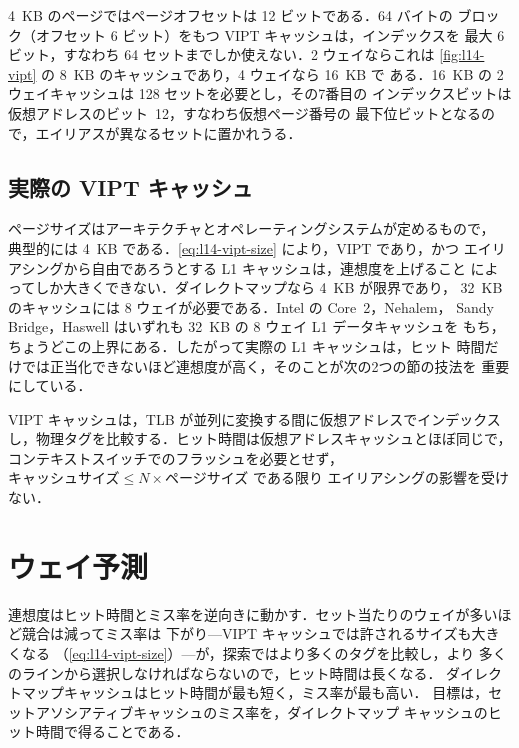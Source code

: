 \documentclass[../main.tex]{subfiles}
\begin{document}
\begin{example}
  \label{ex:l14-vipt-size}
  4~KB のページではページオフセットは 12 ビットである．64 バイトの
  ブロック（オフセット 6 ビット）をもつ VIPT キャッシュは，インデックスを
  最大 6 ビット，すなわち 64 セットまでしか使えない．2 ウェイならこれは
  \cref{fig:l14-vipt} の 8~KB のキャッシュであり，4 ウェイなら 16~KB で
  ある．16~KB の 2 ウェイキャッシュは 128 セットを必要とし，その7番目の
  インデックスビットは仮想アドレスのビット~12，すなわち仮想ページ番号の
  最下位ビットとなるので，エイリアスが異なるセットに置かれうる．
\end{example}

\subsection{実際の VIPT キャッシュ}

ページサイズはアーキテクチャとオペレーティングシステムが定めるもので，
典型的には 4~KB である．\cref{eq:l14-vipt-size} により，VIPT であり，かつ
エイリアシングから自由であろうとする L1 キャッシュは，連想度を上げること
によってしか大きくできない．ダイレクトマップなら 4~KB が限界であり，
32~KB のキャッシュには 8 ウェイが必要である．Intel の Core~2，Nehalem，
Sandy Bridge，Haswell はいずれも 32~KB の 8 ウェイ L1 データキャッシュを
もち，ちょうどこの上界にある．したがって実際の L1 キャッシュは，ヒット
時間だけでは正当化できないほど連想度が高く，そのことが次の2つの節の技法を
重要にしている．

\begin{keypoint}
  VIPT キャッシュは，TLB が並列に変換する間に仮想アドレスでインデックス
  し，物理タグを比較する．ヒット時間は仮想アドレスキャッシュとほぼ同じで，
  コンテキストスイッチでのフラッシュを必要とせず，
  $\text{キャッシュサイズ} \le N \times \text{ページサイズ}$ である限り
  エイリアシングの影響を受けない．
\end{keypoint}

\section{ウェイ予測}
\label{sec:l14-way-prediction}

連想度はヒット時間とミス率を逆向きに動かす．セット当たりのウェイが多いほど競合は減ってミス率は
下がり---VIPT キャッシュでは許されるサイズも大きくなる
（\cref{eq:l14-vipt-size}）---が，探索ではより多くのタグを比較し，より
多くのラインから選択しなければならないので，ヒット時間は長くなる．
ダイレクトマップキャッシュはヒット時間が最も短く，ミス率が最も高い．
目標は，セットアソシアティブキャッシュのミス率を，ダイレクトマップ
キャッシュのヒット時間で得ることである．
\end{document}
